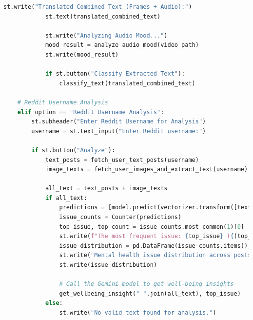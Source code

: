     \begin{tcolorbox}[colback=gray!5!white, colframe=gray!80!black, boxrule=0.5pt, title=Streamlit Mental Health Disorder Detection App]
        \begin{lstlisting}[language=Python]
            st.write("Translated Combined Text (Frames + Audio):")
            st.text(translated_combined_text)

            st.write("Analyzing Audio Mood...")
            mood_result = analyze_audio_mood(video_path)
            st.write(mood_result)

            if st.button("Classify Extracted Text"):
                classify_text(translated_combined_text)

    # Reddit Username Analysis
    elif option == "Reddit Username Analysis":
        st.subheader("Enter Reddit Username for Analysis")
        username = st.text_input("Enter Reddit username:")

        if st.button("Analyze"):
            text_posts = fetch_user_text_posts(username)
            image_texts = fetch_user_images_and_extract_text(username)

            all_text = text_posts + image_texts
            if all_text:
                predictions = [model.predict(vectorizer.transform([text]))[0] for text in all_text]
                issue_counts = Counter(predictions)
                top_issue, top_count = issue_counts.most_common(1)[0]
                st.write(f"The most frequent issue: {top_issue} ({(top_count / len(predictions)) * 100:.2f}%)")
                issue_distribution = pd.DataFrame(issue_counts.items(), columns=['Mental Health Issue', 'Count'])
                st.write("Mental health issue distribution across posts:")
                st.write(issue_distribution)

                # Call the Gemini model to get well-being insights
                get_wellbeing_insight(" ".join(all_text), top_issue)
            else:
                st.write("No valid text found for analysis.")
            \end{lstlisting}
        \end{tcolorbox}

